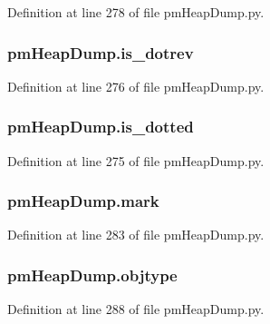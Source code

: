 Definition at line 278 of file pm\-Heap\-Dump.\-py.

\hypertarget{namespacepm_heap_dump_a6f9a7057f35e4683fef5fc0b7a207ae0}{
\subsubsection[{is\-\_\-dotrev}]{\setlength{\rightskip}{0pt plus 5cm}pm\-Heap\-Dump.\-is\-\_\-dotrev}}\label{namespacepm_heap_dump_a6f9a7057f35e4683fef5fc0b7a207ae0}


Definition at line 276 of file pm\-Heap\-Dump.\-py.

\hypertarget{namespacepm_heap_dump_a1ac63bf4b6f96fcf998f80241d725b0d}{
\subsubsection[{is\-\_\-dotted}]{\setlength{\rightskip}{0pt plus 5cm}pm\-Heap\-Dump.\-is\-\_\-dotted}}\label{namespacepm_heap_dump_a1ac63bf4b6f96fcf998f80241d725b0d}


Definition at line 275 of file pm\-Heap\-Dump.\-py.

\hypertarget{namespacepm_heap_dump_a44db4bf4dd96792fae3cc43a15936775}{
\subsubsection[{mark}]{\setlength{\rightskip}{0pt plus 5cm}pm\-Heap\-Dump.\-mark}}\label{namespacepm_heap_dump_a44db4bf4dd96792fae3cc43a15936775}


Definition at line 283 of file pm\-Heap\-Dump.\-py.

\hypertarget{namespacepm_heap_dump_a0be8bf70a7f9c16e5457936ad066f381}{
\subsubsection[{objtype}]{\setlength{\rightskip}{0pt plus 5cm}pm\-Heap\-Dump.\-objtype}}\label{namespacepm_heap_dump_a0be8bf70a7f9c16e5457936ad066f381}


Definition at line 288 of file pm\-Heap\-Dump.\-py.

